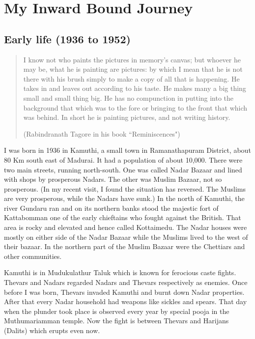 
\part{My Inward Bound Journey}


\chapter{Early life (1936 to 1952)}

\begin{quote}
I know not who paints the pictures in memory's canvas; but whoever
he may be, what he is painting are pictures: by which I mean that 
he is not there with his brush simply to make a copy of all that is
happening. He takes in and leaves out according to his taste. He
makes many a big thing small and small thing big. He has no compunction 
in putting into the background that which was to the fore or bringing
to the front that which was behind. In short he is painting pictures,
and not writing history.

\hfill (Rabindranath Tagore in his book ``Reminiscences")
\end{quote}


I was born in 1936 in Kamuthi, a small town in Ramanathapuram District, 
about 80 Km south east of Madurai. It had a population of about 10,000. 
There were two main streets, running north-south. One was called Nadar 
Bazaar and lined with shops by prosperous Nadars. The other was Muslim 
Bazaar, not so prosperous. (In my recent visit, I found the situation 
has reversed. The Muslims are very prosperous, while the Nadars have 
sunk.) In the north of Kamuthi, the river Gundaru ran and on its 
northern banks stood the majestic fort of Kattabomman one of the early 
chieftains who fought against the British. That area is rocky and 
elevated and hence called Kottaimedu. The Nadar houses were mostly on 
either side of the Nadar Bazaar while the Muslims lived to the west of 
their bazaar. In the northern part of the Muslim Bazaar were the 
Chettiars and other communities.

Kamuthi is in Mudukulathur Taluk which is known for ferocious caste 
fights. Thevars and Nadars regarded Nadars and Thevars respectively as 
enemies. Once before I was born, Thevars invaded Kamuthi and burnt down 
Nadar properties. After that every Nadar household had weapons like 
sickles and spears. That day when the plunder took place is observed 
every year by special pooja in the Muthumariamman temple. Now the fight 
is between Thevars and Harijans (Dalits) which erupts even now.

